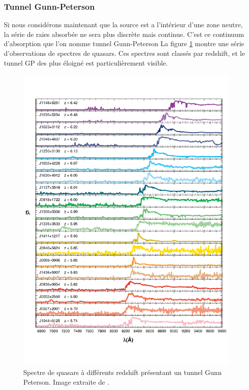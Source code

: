 \subsubsection*{Tunnel Gunn-Peterson}

Si nous considérons maintenant que la source est a l’intérieur d'une zone neutre, la série de raies absorbée ne sera plus discrète mais continue.
C'est ce continuum d’absorption que l'on nomme tunnel Gunn-Peterson \cite{1965ApJ...141.1295S}
La figure \ref{fig:spectre_quasar} montre une série d'observations de spectres de quasars.
Ces spectres sont classés par redshift, et le tunnel GP des plus éloigné est particulièrement visible.


\begin{figure}
        \includegraphics[width=.95\linewidth]{img/01/quasar_spectre.pdf} 
        \caption[Spectre de quasars]{Spectre de quasars à différents redshift présentant un tunnel Gunn Peterson.
		Image extraite de \cite{fan_constraining_2006}.
 		\label{fig:spectre_quasar}}
\end{figure}

